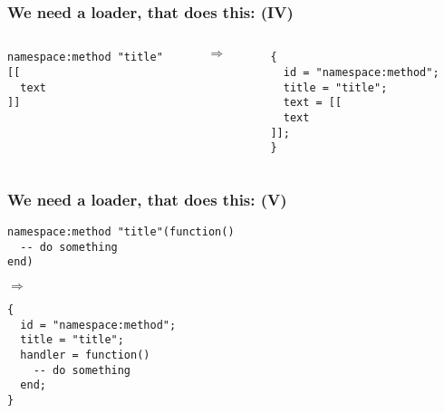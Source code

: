 \documentclass[handout]{beamer}
\begin{document}

\begin{frame}[fragile]

\frametitle{We need a loader, that does this: (IV)}

\begin{columns}

\begin{column}{0.5\textwidth}
\begin{verbatim}
namespace:method "title"
[[
  text
]]
\end{verbatim}
\end{column}

\begin{column}{0.05\textwidth}
$\Rightarrow$
\end{column}

\begin{column}{0.5\textwidth}
\begin{verbatim}
{
  id = "namespace:method";
  title = "title";
  text = [[
  text
]];
}
\end{verbatim}
\end{column}

\end{columns}

\end{frame}


\begin{frame}[fragile]

\frametitle{We need a loader, that does this: (V)}

\begin{verbatim}
namespace:method "title"(function()
  -- do something
end)
\end{verbatim}

$\Rightarrow$

\begin{verbatim}
{
  id = "namespace:method";
  title = "title";
  handler = function()
    -- do something
  end;
}
\end{verbatim}

\end{frame}

\end{document}
